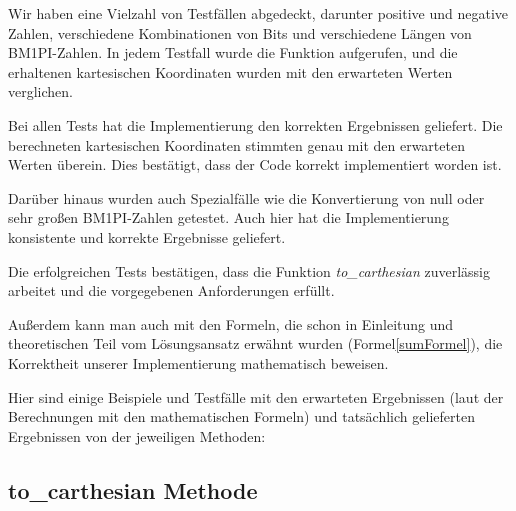\documentclass[course=erap]{aspdoc}
\begin{document}
    Wir haben eine Vielzahl von Testfällen abgedeckt, darunter positive und negative Zahlen, verschiedene Kombinationen von Bits und verschiedene Längen von BM1PI-Zahlen.
    In jedem Testfall wurde die Funktion aufgerufen, und die erhaltenen kartesischen Koordinaten wurden mit den erwarteten Werten verglichen.

    Bei allen Tests hat die Implementierung den korrekten Ergebnissen geliefert.
    Die berechneten kartesischen Koordinaten stimmten genau mit den erwarteten Werten überein.
    Dies bestätigt, dass der Code korrekt implementiert worden ist.

    Darüber hinaus wurden auch Spezialfälle wie die Konvertierung von null oder sehr großen BM1PI-Zahlen getestet.
    Auch hier hat die Implementierung konsistente und korrekte Ergebnisse geliefert.

    Die erfolgreichen Tests bestätigen, dass die Funktion \textit{to\_carthesian} zuverlässig arbeitet und die vorgegebenen Anforderungen erfüllt.

    Außerdem kann man auch mit den Formeln, die schon in Einleitung und theoretischen Teil vom Lösungsansatz erwähnt wurden (Formel\ref{sumFormel}), die Korrektheit unserer Implementierung mathematisch beweisen.

    Hier sind einige Beispiele und Testfälle mit den erwarteten Ergebnissen (laut der Berechnungen mit den mathematischen Formeln) und tatsächlich gelieferten Ergebnissen von der jeweiligen Methoden:

    \subsection{to\_carthesian Methode}

\end{document}
